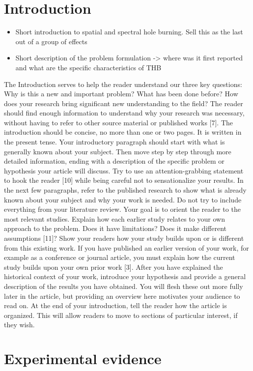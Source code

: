 \documentclass[]{spie}  %
\begin{document}
\section{Introduction} \begin{itemize} 
\item {Short introduction to spatial and spectral hole burning.
	 Sell this as the last out of a group of effects} \item
 	{Short description of the problem formulation -> where was it first reported
 		and what are the specific characteristics of THB} 
\end{itemize} 
The Introduction serves to help the reader understand our three key questions: Why
is this a new and important problem?  What has been done before? How does your
research bring significant new understanding to the field? The reader should
find enough information to understand why your research was necessary, without
having to refer to other source material or published works [7]. The
introduction should be concise, no more than one or two pages. It is written in
the present tense.  Your introductory paragraph should start with what is
generally known about your subject. Then move step by step through more
detailed information, ending with a description of the specific problem or
hypothesis your article will discuss. Try to use an attention-grabbing
statement to hook the reader [10] while being careful not to sensationalize
your results.  In the next few paragraphs, refer to the published research to
show what is already known about your subject and why your work is needed. Do
not try to include everything from your literature review. Your goal is to
orient the reader to the most relevant studies. Explain how each earlier study
relates to your own approach to the problem. Does it have limitations? Does it
make different assumptions [11]? Show your readers how your study builds upon
or is different from this existing work. If you have published an earlier
version of your work, for example as a conference or journal article, you must
explain how the current study builds upon your own prior work [3].  After you
have explained the historical context of your work, introduce your hypothesis
and provide a general description of the results you have obtained. You will
flesh these out more fully later in the article, but providing an overview here
motivates your audience to read on. At the end of your introduction, tell the
reader how the article is organized. This will allow readers to move to
sections of particular interest, if they wish.  \section{Experimental evidence}
\end{document}
